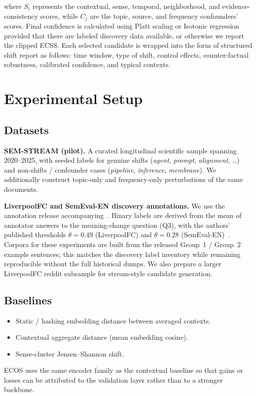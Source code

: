\documentclass{llncs}
\begin{document}
where $S_i$ represents the contextual, sense, temporal, neighborhood, and evidence-consistency scores, while $C_j$ are the topic, source, and frequency confounders’ scores. Final confidence is calculated using Platt scaling or Isotonic regression provided that there are labeled discovery data available, or otherwise we report the clipped ECSS. Each selected candidate is wrapped into the form of structured shift report as follows: time window, type of shift, control effects, counter-factual robustness, calibrated confidence, and typical contexts.

\section{Experimental Setup}
\label{sec:setup}

\subsection{Datasets}
\textbf{SEM-STREAM (pilot).}
A curated longitudinal scientific sample spanning 2020--2025, with seeded labels for genuine shifts (\textit{agent}, \textit{prompt}, \textit{alignment}, \ldots) and non-shifts / confounder cases (\textit{pipeline}, \textit{inference}, \textit{membrane}).
We additionally construct topic-only and frequency-only perturbations of the same documents.

\textbf{LiverpoolFC and SemEval-EN discovery annotations.}
We use the annotation release accompanying~\cite{umarova2025discovery}.
Binary labels are derived from the mean of annotator answers to the meaning-change question (Q3), with the authors' published thresholds $\theta=0.49$ (LiverpoolFC) and $\theta=0.28$ (SemEval-EN)~\cite{kurup2025truth}.
Corpora for these experiments are built from the released Group~1 / Group~2 example sentences; this matches the discovery label inventory while remaining reproducible without the full historical dumps.
We also prepare a larger LiverpoolFC reddit subsample for stream-style candidate generation.

\subsection{Baselines}
\begin{itemize}
\item Static / hashing embedding distance between averaged contexts.
\item Contextual aggregate distance (mean embedding cosine).
\item Sense-cluster Jensen--Shannon shift.
\end{itemize}
ECOS uses the same encoder family as the contextual baseline so that gains or losses can be attributed to the validation layer rather than to a stronger backbone.
\end{document}
